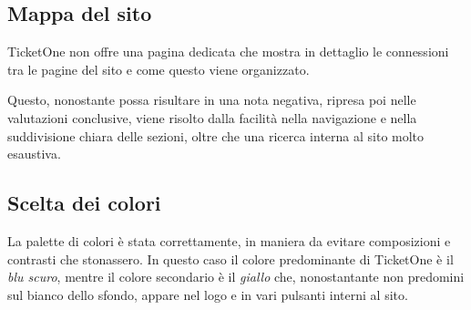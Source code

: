\subsection{Mappa del sito}
	
	TicketOne non offre una pagina dedicata che mostra in dettaglio le connessioni tra le pagine del sito e come questo viene organizzato.\par
	Questo, nonostante possa risultare in una nota negativa, ripresa poi nelle valutazioni conclusive, viene risolto dalla facilità nella navigazione e nella suddivisione chiara delle sezioni, oltre che una ricerca interna al sito molto esaustiva.

\subsection{Scelta dei colori}
	
	La palette di colori è stata correttamente, in maniera da evitare composizioni e contrasti che stonassero.
	In questo caso il colore predominante di TicketOne è il \textit{blu scuro}, mentre il colore secondario è il \textit{giallo} che, nonostantante non predomini sul bianco dello sfondo, appare nel logo e in vari pulsanti interni al sito.